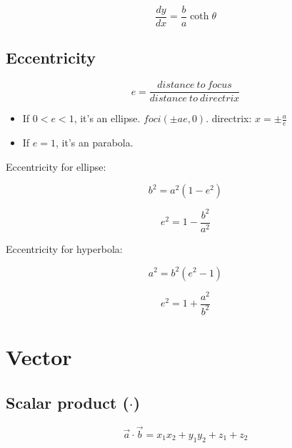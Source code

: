 \documentclass[a4paper,9pt]{scrartcl}
\begin{document}
    \begin{displaymath}
        \frac{dy}{dx} = \frac{b}{a}\coth\theta
    \end{displaymath}

    \subsection{Eccentricity}

    \begin{displaymath}
        e = \frac{distance\ to\ focus}{distance\ to\ directrix}
    \end{displaymath}

    \begin{itemize}
        \item If $0 < e < 1$, it's an ellipse.
        $foci({\pm}ae, 0)$.
        directrix: $x = \pm\frac{a}{e}$
        \item If $e = 1$, it's an parabola.
    \end{itemize}

    Eccentricity for ellipse:

    \begin{displaymath}
        b^2 = a^2(1-e^2)
    \end{displaymath}

    \begin{displaymath}
        e^2 = 1 - \frac{b^2}{a^2}
    \end{displaymath}

    Eccentricity for hyperbola:

    \begin{displaymath}
        a^2 = b^2(e^2-1)
    \end{displaymath}

    \begin{displaymath}
        e^2 = 1 + \frac{a^2}{b^2}
    \end{displaymath}


    \section{Vector}

    \subsection{Scalar product ($\cdot$)}
    \begin{displaymath}
        \vec{a}\cdot\vec{b}= x_1 x_2 + y_1 y_2 + z_1 + z_2
    \end{displaymath}
\end{document}
